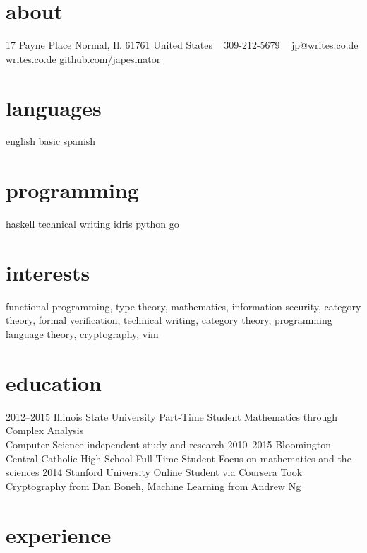 \documentclass[]{friggeri-cv}
\begin{document}


\begin{aside}
  \section{about}
    17 Payne Place
    Normal, Il. 61761
    United States
    ~
    309-212-5679
    ~
    \href{mailto:jp@writes.co.de}{jp@writes.co.de}
    \href{http://writes.co.de}{writes.co.de}
    \href{http://github.com/japesinator}{github.com/japesinator}
  \section{languages}
    english
    basic spanish
  \section{programming}
    haskell
    technical writing
    idris
    python
    go
\end{aside}

\section{interests}

functional programming, type theory, mathematics, information security,
category theory, formal verification, technical writing, category theory,
programming language theory, cryptography, vim

\section{education}

\begin{entrylist}
  \entry
    {2012–2015}
    {Illinois State University}
    {Part-Time Student}
    {Mathematics through Complex Analysis\\
    Computer Science independent study and research}
  \entry
    {2010–2015}
    {Bloomington Central Catholic High School}
    {Full-Time Student}
    {Focus on mathematics and the sciences}
  \entry
    {2014}
    {Stanford University}
    {Online Student via Coursera}
    {Took Cryptography from Dan Boneh, Machine Learning from Andrew Ng}
\end{entrylist}

\section{experience}
\end{document}

